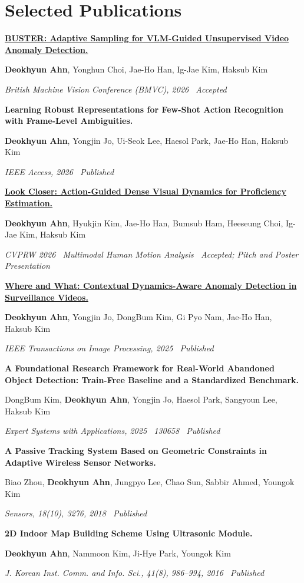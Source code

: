 \documentclass[letterpaper,11pt]{article}
\newcommand{\publication}[3]{%
  \item\begin{minipage}[t]{\linewidth}
    \small\textbf{#1}\par
    #2\par
    \textit{#3}
  \end{minipage}
}
\begin{document}
\section{Selected Publications}
\begin{enumerate}[leftmargin=0.28in,label={[\arabic*]},itemsep=9pt,parsep=0pt]
  \publication
    {\href{https://deo-ahn.github.io/buster/}{BUSTER: Adaptive Sampling for VLM-Guided Unsupervised Video Anomaly Detection.}}
    {\textbf{Deokhyun Ahn}, Yonghun Choi, Jae-Ho Han, Ig-Jae Kim, Haksub Kim}
    {British Machine Vision Conference (BMVC), 2026 \textbar\ Accepted}
  \publication
    {Learning Robust Representations for Few-Shot Action Recognition with Frame-Level Ambiguities.}
    {\textbf{Deokhyun Ahn}, Yongjin Jo, Ui-Seok Lee, Haesol Park, Jae-Ho Han, Haksub Kim}
    {IEEE Access, 2026 \textbar\ Published}
  \publication
    {\href{https://skill-lens.net/}{Look Closer: Action-Guided Dense Visual Dynamics for Proficiency Estimation.}}
    {\textbf{Deokhyun Ahn}, Hyukjin Kim, Jae-Ho Han, Bumsub Ham, Heeseung Choi, Ig-Jae Kim, Haksub Kim}
    {CVPRW 2026 \textbar\ Multimodal Human Motion Analysis \textbar\ Accepted; Pitch and Poster Presentation}
  \publication
    {\href{https://ieeexplore.ieee.org/document/11217333}{Where and What: Contextual Dynamics-Aware Anomaly Detection in Surveillance Videos.}}
    {\textbf{Deokhyun Ahn}, Yongjin Jo, DongBum Kim, Gi Pyo Nam, Jae-Ho Han, Haksub Kim}
    {IEEE Transactions on Image Processing, 2025 \textbar\ Published}
  \publication
    {A Foundational Research Framework for Real-World Abandoned Object Detection: Train-Free Baseline and a Standardized Benchmark.}
    {DongBum Kim, \textbf{Deokhyun Ahn}, Yongjin Jo, Haesol Park, Sangyoun Lee, Haksub Kim}
    {Expert Systems with Applications, 2025 \textbar\ 130658 \textbar\ Published}
  \publication
    {A Passive Tracking System Based on Geometric Constraints in Adaptive Wireless Sensor Networks.}
    {Biao Zhou, \textbf{Deokhyun Ahn}, Jungpyo Lee, Chao Sun, Sabbir Ahmed, Youngok Kim}
    {Sensors, 18(10), 3276, 2018 \textbar\ Published}
  \publication
    {2D Indoor Map Building Scheme Using Ultrasonic Module.}
    {\textbf{Deokhyun Ahn}, Nammoon Kim, Ji-Hye Park, Youngok Kim}
    {J. Korean Inst. Comm. and Info. Sci., 41(8), 986--994, 2016 \textbar\ Published}
\end{enumerate}

\end{document}
